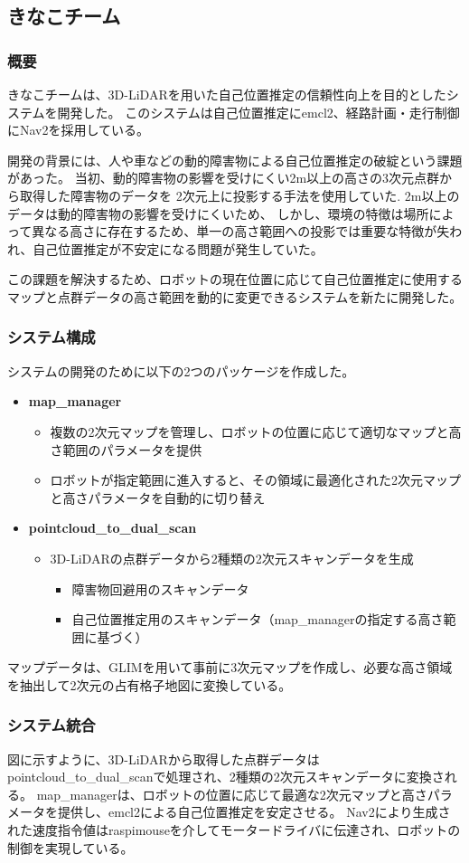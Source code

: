 \subsection{きなこチーム}

\subsubsection{概要}
きなこチームは、3D-LiDARを用いた自己位置推定の信頼性向上を目的としたシステムを開発した。
このシステムは自己位置推定にemcl2、経路計画・走行制御にNav2を採用している。

開発の背景には、人や車などの動的障害物による自己位置推定の破綻という課題があった。
当初、動的障害物の影響を受けにくい2m以上の高さの3次元点群から取得した障害物のデータを
2次元上に投影する手法を使用していた.
2m以上のデータは動的障害物の影響を受けにくいため、
しかし、環境の特徴は場所によって異なる高さに存在するため、単一の高さ範囲への投影では重要な特徴が失われ、自己位置推定が不安定になる問題が発生していた。

この課題を解決するため、ロボットの現在位置に応じて自己位置推定に使用するマップと点群データの高さ範囲を動的に変更できるシステムを新たに開発した。

\subsubsection{システム構成}
システムの開発のために以下の2つのパッケージを作成した。

\begin{itemize}
  \item \textbf{map\_manager}
    \begin{itemize}
      \item 複数の2次元マップを管理し、ロボットの位置に応じて適切なマップと高さ範囲のパラメータを提供
      \item ロボットが指定範囲に進入すると、その領域に最適化された2次元マップと高さパラメータを自動的に切り替え
    \end{itemize}
  \item \textbf{pointcloud\_to\_dual\_scan}
    \begin{itemize}
      \item 3D-LiDARの点群データから2種類の2次元スキャンデータを生成
        \begin{itemize}
          \item 障害物回避用のスキャンデータ
          \item 自己位置推定用のスキャンデータ（map\_managerの指定する高さ範囲に基づく）
        \end{itemize}
    \end{itemize}
\end{itemize}

マップデータは、GLIMを用いて事前に3次元マップを作成し、必要な高さ領域を抽出して2次元の占有格子地図に変換している。


\subsubsection{システム統合}
図に示すように、3D-LiDARから取得した点群データはpointcloud\_to\_dual\_scanで処理され、2種類の2次元スキャンデータに変換される。
map\_managerは、ロボットの位置に応じて最適な2次元マップと高さパラメータを提供し、emcl2による自己位置推定を安定させる。
Nav2により生成された速度指令値はraspimouseを介してモータードライバに伝達され、ロボットの制御を実現している。
